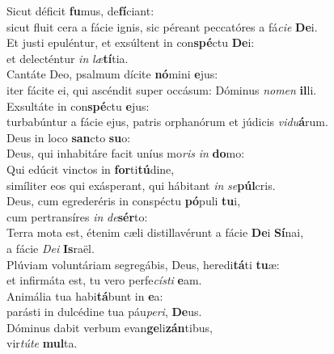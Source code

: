 \evenverse Sicut déficit \textbf{fu}mus, de\textbf{fí}ciant:~\*\\
\evenverse sicut fluit cera a fácie ignis, sic péreant peccatóres a fá\textit{ci}\textit{e} \textbf{De}i.\\
\oddverse Et justi epuléntur, et exsúltent in con\textbf{spé}ctu \textbf{De}i:~\*\\
\oddverse et delecténtur \textit{in} \textit{læ}\textbf{tí}tia.\\
\evenverse Cantáte Deo, psalmum dícite \textbf{nó}mini \textbf{e}jus:~\*\\
\evenverse iter fácite ei, qui ascéndit super occásum: Dóminus \textit{no}\textit{men} \textbf{il}li.\\
\oddverse Exsultáte in con\textbf{spé}ctu \textbf{e}jus:~\*\\
\oddverse turbabúntur a fácie ejus, patris orphanórum et júdicis \textit{vi}\textit{du}\textbf{á}rum.\\
\evenverse Deus in loco \textbf{san}cto \textbf{su}o:~\*\\
\evenverse Deus, qui inhabitáre facit uníus mo\textit{ris} \textit{in} \textbf{do}mo:\\
\oddverse Qui edúcit vinctos in \textbf{for}ti\textbf{tú}dine,~\*\\
\oddverse simíliter eos qui exásperant, qui hábitant \textit{in} \textit{se}\textbf{púl}cris.\\
\evenverse Deus, cum egrederéris in conspéctu \textbf{pó}puli \textbf{tu}i,~\*\\
\evenverse cum pertransíres \textit{in} \textit{de}\textbf{sér}to:\\
\oddverse Terra mota est, étenim cæli distillavérunt a fácie \textbf{De}i \textbf{Sí}nai,~\*\\
\oddverse a fácie \textit{De}\textit{i} \textbf{Is}raël.\\
\evenverse Plúviam voluntáriam segregábis, Deus, heredi\textbf{tá}ti \textbf{tu}æ:~\*\\
\evenverse et infirmáta est, tu vero perfe\textit{cí}\textit{sti} \textbf{e}am.\\
\oddverse Animália tua habi\textbf{tá}bunt in \textbf{e}a:~\*\\
\oddverse parásti in dulcédine tua páu\textit{pe}\textit{ri}, \textbf{De}us.\\
\evenverse Dóminus dabit verbum evan\textbf{ge}li\textbf{zán}tibus,~\*\\
\evenverse vir\textit{tú}\textit{te} \textbf{mul}ta.\\
